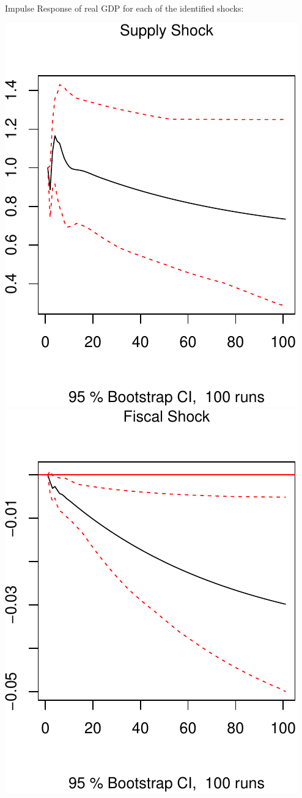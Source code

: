 \documentclass[11pt,preprint, authoryear]{elsarticle}
\numberwithin{equation}{section}
\numberwithin{figure}{section}
\numberwithin{table}{section}
\begin{document}
Impulse Response of real GDP for each of the identified shocks:

\includegraphics{TS_proj_files/figure-latex/unnamed-chunk-36-1.pdf}
\includegraphics{TS_proj_files/figure-latex/unnamed-chunk-36-2.pdf}
\end{document}
